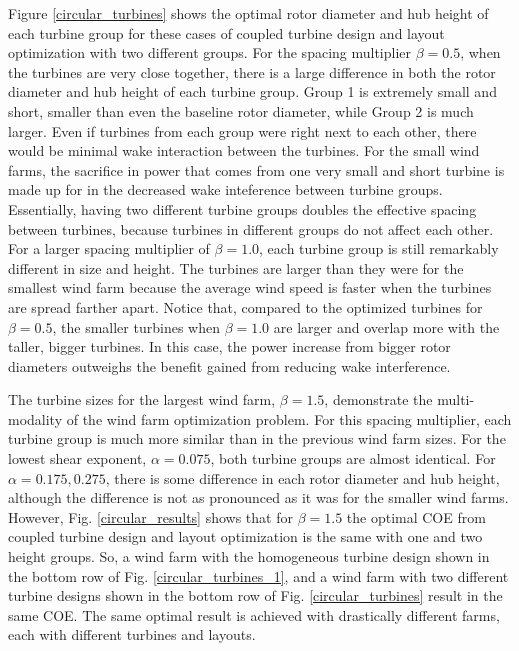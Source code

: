 Figure \ref{circular_turbines} shows the optimal rotor diameter and hub height of each turbine group for these cases of coupled turbine design and layout optimization with two different groups. For the spacing multiplier $\beta=0.5$, when the turbines are very close together, there is a large difference in both the rotor diameter and hub height of each turbine group. Group 1 is extremely small and short, smaller than even the baseline rotor diameter, while Group 2 is much larger. Even if turbines from each group were right next to each other, there would be minimal wake interaction between the turbines. For the small wind farms, the sacrifice in power that comes from one very small and short turbine is made up for in the decreased wake inteference between turbine groups. Essentially, having two different turbine groups doubles the effective spacing between turbines, because turbines in different groups do not affect each other. For a larger spacing multiplier of $\beta=1.0$, each turbine group is still remarkably different in size and height. The turbines are larger than they were for the smallest wind farm because the average wind speed is faster when the turbines are spread farther apart. Notice that, compared to the optimized turbines for $\beta=0.5$, the smaller turbines when $\beta=1.0$ are larger and overlap more with the taller, bigger turbines. In this case, the power increase from bigger rotor diameters outweighs the benefit gained from reducing wake interference. 

The turbine sizes for the largest wind farm, $\beta=1.5$, demonstrate the multi-modality of the wind farm optimization problem. For this spacing multiplier, each turbine group is much more similar than in the previous wind farm sizes. For the lowest shear exponent, $\alpha=0.075$, both turbine groups are almost identical. For $\alpha=0.175,0.275$, there is some difference in each rotor diameter and hub height, although the difference is not as pronounced as it was for the smaller wind farms. However, Fig. \ref{circular_results} shows that for $\beta=1.5$ the optimal COE from coupled turbine design and layout optimization is the same with one and two height groups. So, a wind farm with the homogeneous turbine design shown in the bottom row of Fig. \ref{circular_turbines_1}, and a wind farm with two different turbine designs shown in the bottom row of Fig. \ref{circular_turbines} result in the same COE. The same optimal result is achieved with drastically different farms, each with different turbines and layouts.  

